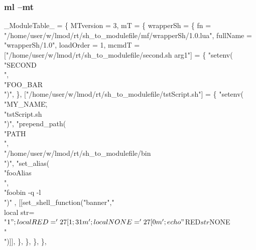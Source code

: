 \documentclass{beamer}
\begin{document}
\begin{frame}[fragile]
  \frametitle{ml --mt}
    {\tiny
\begin{semiverbatim}
\_ModuleTable\_ = \{
  MTversion = 3,
  mT = \{
    wrapperSh = \{
      fn = "/home/user/w/lmod/rt/sh_to_modulefile/mf/wrapperSh/1.0.lua",
      fullName = "wrapperSh/1.0",
      loadOrder = 1,
      mcmdT = {
        ["/home/user/w/lmod/rt/sh_to_modulefile/second.sh arg1"] = \{
          "setenv(\\"SECOND\\",\\"FOO_BAR\\")",
        \},
        ["/home/user/w/lmod/rt/sh_to_modulefile/tstScript.sh"] = \{
          "setenv(\\"MY_NAME\",\\"tstScript.sh\\")",
          "prepend_path(\\"PATH\\",\\"/home/user/w/lmod/rt/sh_to_modulefile/bin\\")",
          "set_alias(\\"fooAlias\\",\\"foobin -q -l\\")"
          , [[set_shell_function("banner"," \\
    local str=\\"$1\\";\\
    local RED='\\27[1;31m';\\
    local NONE='\\27[0m';\\
    echo \\"${RED}${str}${NONE}\\"\\
")]], 
        \},
      \},
    \},
  \},
}
\end{semiverbatim}
    }
\end{frame}
\end{document}
